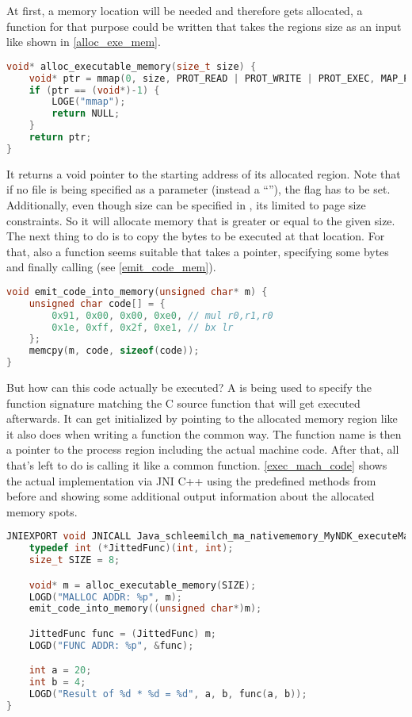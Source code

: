 At first, a memory location will be needed and therefore gets allocated,
a function for that purpose could be written that takes the regions size as an input like shown in \autoref{alloc_exe_mem}.
\begin{lstlisting}[language=C++, caption=alloc\_executable\_memory(), label=alloc_exe_mem]
void* alloc_executable_memory(size_t size) {
    void* ptr = mmap(0, size, PROT_READ | PROT_WRITE | PROT_EXEC, MAP_PRIVATE | MAP_ANONYMOUS, -1, 0);
    if (ptr == (void*)-1) {
        LOGE("mmap");
        return NULL;
    }
    return ptr;
}
\end{lstlisting}
It returns a void pointer to the starting address of its allocated region. Note that
if no file is being specified as a  parameter (instead a ``''),
the  flag has to be set. Additionally, even though size can be specified in , its limited to page size constraints. So it will allocate
memory that is greater or equal to the given size.
The next thing to do is to copy the bytes to be executed at that location. For that,
also a function seems suitable that takes a pointer, specifying some bytes and finally calling  (see \autoref{emit_code_mem}).
\begin{lstlisting}[language=C++, caption=emit\_code\_into\_memory(), label=emit_code_mem]
void emit_code_into_memory(unsigned char* m) {
    unsigned char code[] = {
        0x91, 0x00, 0x00, 0xe0, // mul r0,r1,r0
        0x1e, 0xff, 0x2f, 0xe1, // bx lr
    };
    memcpy(m, code, sizeof(code));
}
\end{lstlisting}
But how can this code actually be executed?
A  is being used to specify the function signature matching the C source function that will get executed afterwards.
It can get initialized by pointing to the allocated memory region like it also does when
writing a function the common way. The function name is then a pointer to the process region including the actual machine code.
After that, all that's left to do is calling it like a common function.
\autoref{exec_mach_code} shows the actual implementation via JNI C++ using the predefined methods from before and showing some additional output information about
the allocated memory spots.
\begin{lstlisting}[language=C++, caption=executeMachineCode(), label=exec_mach_code]
JNIEXPORT void JNICALL Java_schleemilch_ma_nativememory_MyNDK_executeMachineCode (JNIEnv *env, jobject obj){
    typedef int (*JittedFunc)(int, int);
    size_t SIZE = 8;

    void* m = alloc_executable_memory(SIZE);
    LOGD("MALLOC ADDR: %p", m);
    emit_code_into_memory((unsigned char*)m);

    JittedFunc func = (JittedFunc) m;
    LOGD("FUNC ADDR: %p", &func);

    int a = 20;
    int b = 4;
    LOGD("Result of %d * %d = %d", a, b, func(a, b));
}
\end{lstlisting}
